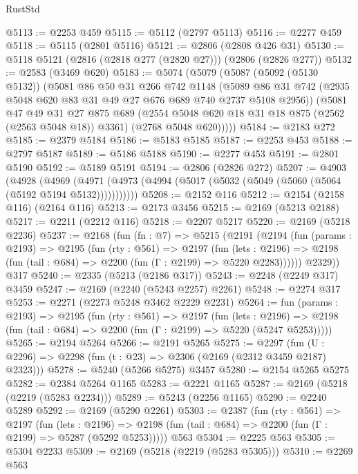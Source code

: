 \begin{lexlean}{RustStd}
\begin{coremodule}
{\begin{coremodule}
{{{{{{{{{{{{{{{@5113 := @2253 @459
@5115 := @5112 (@2797 @5113)
@5116 := @2277 @459
@5118 := @5115 (@2801 @5116)
@5121 := @2806 (@2808 @426 @31)
@5130 := @5118 @5121 (@2816 (@2818 @277 (@2820 @27))) (@2806 (@2826 @277))
@5132 := @2583 (@3469 @620)
@5183 := @5074
    (@5079
      (@5087
        (@5092 (@5130 @5132))
        (@5081
          @86
          @50
          @31
          @266
          @742
          @1148
          (@5089 @86 @31 @742 (@2935 @5048 @620 @83 @31 @49 @27 @676 @689 @740 @2737 @5108 @2956))
          (@5081
            @47
            @49
            @31
            @27
            @875
            @689
            (@2554 @5048 @620 @18 @31 @18 @875 (@2562 (@2563 @5048 @18)) @3361)
            (@2768 @5048 @620)))))
@5184 := @2183 @272
@5185 := @2379 @5184
@5186 := @5183 @5185
@5187 := @2253 @453
@5188 := @2797 @5187
@5189 := @5186 @5188
@5190 := @2277 @453
@5191 := @2801 @5190
@5192 := @5189 @5191
@5194 := @2806 (@2826 @272)
@5207 := @4903
    (@4928
      (@4969 (@4971 (@4973 (@4994 (@5017 (@5032 (@5049 (@5060 (@5064 (@5192 @5194 @5132)))))))))))
@5208 := @2152 @116
@5212 := @2154 (@2158 @116) (@2164 @116)
@5213 := @2173 @3456
@5215 := @2169 (@5213 @2188)
@5217 := @2211 (@2212 @116)
@5218 := @2207 @5217
@5220 := @2169 (@5218 @2236)
@5237 := @2168
    (fun (fn : @7) =>
    @5215
      (@2191
        (@2194
          (fun (params : @2193) =>
          @2195
            (fun (rty : @561) =>
            @2197
              (fun (lets : @2196) =>
              @2198 (fun (tail : @684) => @2200 (fun (Γ : @2199) => @5220 @2283))))))
        @2329))
    @317
@5240 := @2335 (@5213 (@2186 @317))
@5243 := @2248 (@2249 @317) @3459
@5247 := @2169 (@2240 (@5243 @2257) @2261)
@5248 := @2274 @317
@5253 := @2271 (@2273 @5248 @3462 @2229 @2231)
@5264 := fun (params : @2193) =>
  @2195
    (fun (rty : @561) =>
    @2197
      (fun (lets : @2196) =>
      @2198 (fun (tail : @684) => @2200 (fun (Γ : @2199) => @5220 (@5247 @5253)))))
@5265 := @2194 @5264
@5266 := @2191 @5265
@5275 := @2297 (fun (U : @2296) => @2298 (fun (t : @23) => @2306 (@2169 (@2312 @3459 @2187) @2323)))
@5278 := @5240 (@5266 @5275) @3457
@5280 := @2154 @5265 @5275
@5282 := @2384 @5264 @1165
@5283 := @2221 @1165
@5287 := @2169 (@5218 (@2219 (@5283 @2234)))
@5289 := @5243 (@2256 @1165)
@5290 := @2240 @5289
@5292 := @2169 (@5290 @2261)
@5303 := @2387
    (fun (rty : @561) =>
    @2197
      (fun (lets : @2196) =>
      @2198 (fun (tail : @684) => @2200 (fun (Γ : @2199) => @5287 (@5292 @5253)))))
    @563
@5304 := @2225 @563
@5305 := @5304 @2233
@5309 := @2169 (@5218 (@2219 (@5283 @5305)))
@5310 := @2269 @563
}}}}}}}}}}}}}}}
\end{coremodule}}
\end{coremodule}
\end{lexlean}
